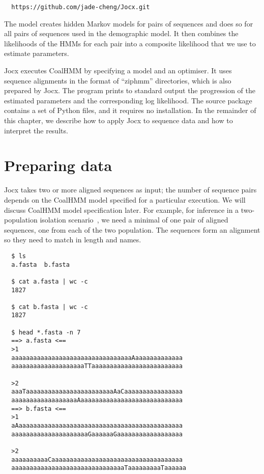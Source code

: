 \documentclass[graybox]{svmult}
\begin{document}
{\small{}\begin{verbatim}
  https://github.com/jade-cheng/Jocx.git
\end{verbatim}}

The model creates hidden Markov models for pairs of sequences and does so for all pairs of sequences used in the demographic model. It then combines the likelihoods of the HMMs for each pair into a composite likelihood that we use to estimate parameters.

Jocx executes CoalHMM by specifying a model and an optimiser. It uses sequence alignments in the format of ``ziphmm'' directories, which is also prepared by Jocx. The program prints to standard output the progression of the estimated parameters and the corresponding log likelihood. The source package contains a set of Python files, and it requires no installation. In the remainder of this chapter, we describe how to apply Jocx to sequence data and how to interpret the results.


\section{Preparing data}

Jocx takes two or more aligned sequences as input; the number of sequence pairs depends on the CoalHMM model specified for a particular execution. We will discuss CoalHMM model specification later. For example, for inference in a two-population isolation scenario~\cite{Mailund:2011dva}, we need a minimal of one pair of aligned sequences, one from each of the two population. The sequences form an alignment so they need to match in length and names.

{\small{}\begin{verbatim}
  $ ls
  a.fasta  b.fasta

  $ cat a.fasta | wc -c
  1827

  $ cat b.fasta | wc -c
  1827

  $ head *.fasta -n 7
  ==> a.fasta <==
  >1
  aaaaaaaaaaaaaaaaaaaaaaaaaaaaaaaaaAaaaaaaaaaaaaa
  aaaaaaaaaaaaaaaaaaaaTTaaaaaaaaaaaaaaaaaaaaaaaaa

  >2
  aaaTaaaaaaaaaaaaaaaaaaaaaaaaAaCaaaaaaaaaaaaaaaa
  aaaaaaaaaaaaaaaaaaAaaaaaaaaaaaaaaaaaaaaaaaaaaaa
  ==> b.fasta <==
  >1
  aAaaaaaaaaaaaaaaaaaaaaaaaaaaaaaaaaaaaaaaaaaaaaa
  aaaaaaaaaaaaaaaaaaaaaGaaaaaaGaaaaaaaaaaaaaaaaaa

  >2
  aaaaaaaaaaCaaaaaaaaaaaaaaaaaaaaaaaaaaaaaaaaaaaa
  aaaaaaaaaaaaaaaaaaaaaaaaaaaaaaaTaaaaaaaaaTaaaaaa
\end{verbatim}}
\end{document}
